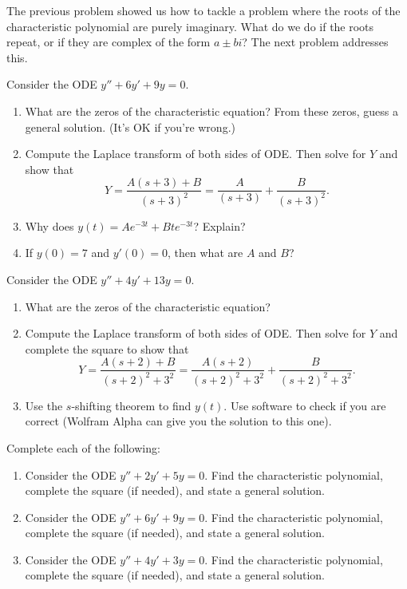 The previous problem showed us how to tackle a problem where the roots of the characteristic polynomial are purely imaginary. What do we do if the roots repeat, or if they are complex of the form $a\pm bi$?  The next problem addresses this.  

\begin{problem}
 Consider the ODE $y''+6y'+9y=0$.  
\begin{enumerate}
 \item What are the zeros of the characteristic equation? From these zeros, guess a general solution. (It's OK if you're wrong.)
 \item Compute the Laplace transform of both sides of ODE. Then solve for $Y$ and show that 
$$Y = \frac{A(s+3)+B}{(s+3)^2} =  \frac{A}{(s+3)}+\frac{B}{(s+3)^2}. $$
 \item Why does $y(t) = Ae^{-3t}+Bte^{-3t}$?  Explain? 
 \item If $y(0)=7$ and $y'(0)=0$, then what are $A$ and $B$?
\end{enumerate}
\end{problem}

\begin{problem}
 Consider the ODE $y''+4y'+13y=0$.  
\begin{enumerate}
 \item What are the zeros of the characteristic equation?
 \item Compute the Laplace transform of both sides of ODE. Then solve for $Y$ and complete the square to show that 
$$Y = \frac{A(s+2)+B}{(s+2)^2+3^2} = \frac{A(s+2)}{(s+2)^2+3^2} +  \frac{B}{(s+2)^2+3^2}. $$
 \item Use the $s$-shifting theorem to find $y(t)$. Use software to check if you are correct (Wolfram Alpha can give you the solution to this one).  
\end{enumerate}
\end{problem}


\begin{problem}
Complete each of the following:
\begin{enumerate}
 \item
{}%
 Consider the ODE $y''+2y'+5y=0$. Find the characteristic polynomial, complete the square (if needed), and state a general solution. 
 \item 
{}%
Consider the ODE $y''+6y'+9y=0$. Find the characteristic polynomial, complete the square (if needed), and state a general solution. 
 \item Consider the ODE $y''+4y'+3y=0$. Find the characteristic polynomial, complete the square (if needed), and state a general solution. 
\end{enumerate}
\end{problem}








